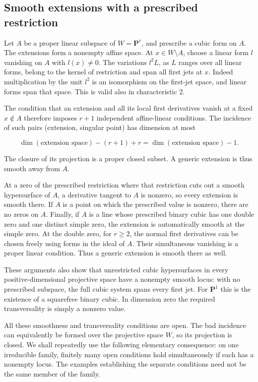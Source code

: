 \documentclass[11pt]{article}
\begin{document}
\subsection{Smooth extensions with a prescribed restriction}\label{sec:cubic-extensions}

Let \(A\) be a proper linear subspace of \(W=\mathbf P^r\), and prescribe a cubic form on \(A\). The extensions form a nonempty affine space. At \(x\in W\setminus A\), choose a linear form \(l\) vanishing on \(A\) with \(l(x)\ne0\). The variations \(l^2L\), as \(L\) ranges over all linear forms, belong to the kernel of restriction and span all first jets at \(x\). Indeed multiplication by the unit \(l^2\) is an isomorphism on the first-jet space, and linear forms span that space. This is valid also in characteristic 2.

The condition that an extension and all its local first derivatives vanish at a fixed \(x\notin A\) therefore imposes \(r+1\) independent affine-linear conditions. The incidence of such pairs (extension, singular point) has dimension at most

\[
\dim(\text{extension space})-(r+1)+r
=\dim(\text{extension space})-1.
\]

The closure of its projection is a proper closed subset. A generic extension is thus smooth away from \(A\).

At a zero of the prescribed restriction where that restriction cuts out a smooth hypersurface of \(A\), a derivative tangent to \(A\) is nonzero, so every extension is smooth there. If \(A\) is a point on which the prescribed value is nonzero, there are no zeros on \(A\). Finally, if \(A\) is a line whose prescribed binary cubic has one double zero and one distinct simple zero, the extension is automatically smooth at the simple zero. At the double zero, for \(r\ge2\), the normal first derivatives can be chosen freely using forms in the ideal of \(A\). Their simultaneous vanishing is a proper linear condition. Thus a generic extension is smooth there as well.

These arguments also show that unrestricted cubic hypersurfaces in every positive-dimensional projective space have a nonempty smooth locus: with no prescribed subspace, the full cubic system spans every first jet. For \(\mathbf P^1\) this is the existence of a squarefree binary cubic. In dimension zero the required transversality is simply a nonzero value.

All these smoothness and transversality conditions are open. The bad incidence can equivalently be formed over the projective space \(W\), so its projection is closed. We shall repeatedly use the following elementary consequence: on one irreducible family, finitely many open conditions hold simultaneously if each has a nonempty locus. The examples establishing the separate conditions need not be the same member of the family.
\end{document}
